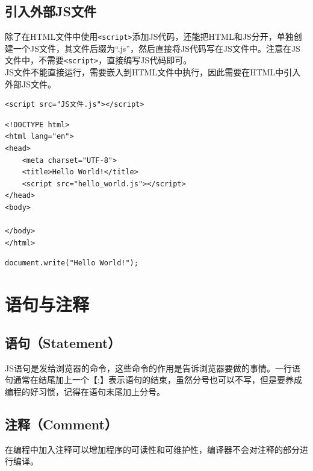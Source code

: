 \subsection{引入外部JS文件}

除了在HTML文件中使用\lstinline|<script>|添加JS代码，还能把HTML和JS分开，单独创建一个JS文件，其文件后缀为“.js”，然后直接将JS代码写在JS文件中。注意在JS文件中，不需要\lstinline|<script>|，直接编写JS代码即可。 \\

JS文件不能直接运行，需要嵌入到HTML文件中执行，因此需要在HTML中引入外部JS文件。 \\

\begin{lstlisting}[style=htmlcssjs]
<script src="JS文件.js"></script>
\end{lstlisting}


\begin{lstlisting}[style=htmlcssjs, title=hello\_world.html]
<!DOCTYPE html>
<html lang="en">
<head>
    <meta charset="UTF-8">
    <title>Hello World!</title>
    <script src="hello_world.js"></script>
</head>
<body>

</body>
</html>
\end{lstlisting}

\begin{lstlisting}[style=htmlcssjs, title=hello\_world.js]
document.write("Hello World!");
\end{lstlisting}

\newpage

\section{语句与注释}

\subsection{语句（Statement）}

JS语句是发给浏览器的命令，这些命令的作用是告诉浏览器要做的事情。一行语句通常在结尾加上一个【;】表示语句的结束，虽然分号也可以不写，但是要养成编程的好习惯，记得在语句末尾加上分号。

\subsection{注释（Comment）}

在编程中加入注释可以增加程序的可读性和可维护性，编译器不会对注释的部分进行编译。 \\

